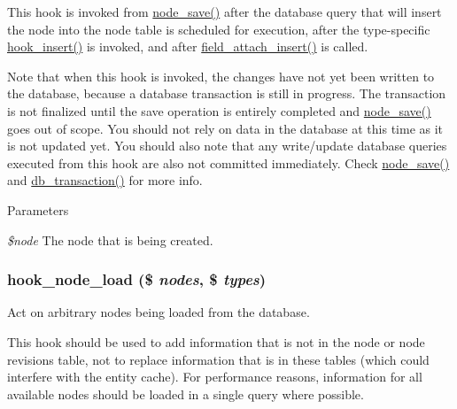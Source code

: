 This hook is invoked from \hyperlink{node_8module_a26add7591be64b30a18232927ef14faf}{node\_\-save()} after the database query that will insert the node into the node table is scheduled for execution, after the type-\/specific \hyperlink{group__node__api__hooks_ga3c6a28d33e07d3506e1eb99718ef4e39}{hook\_\-insert()} is invoked, and after \hyperlink{group__field__attach_gad7c37d577b97db5e0c182bc570ed7cf4}{field\_\-attach\_\-insert()} is called.

Note that when this hook is invoked, the changes have not yet been written to the database, because a database transaction is still in progress. The transaction is not finalized until the save operation is entirely completed and \hyperlink{node_8module_a26add7591be64b30a18232927ef14faf}{node\_\-save()} goes out of scope. You should not rely on data in the database at this time as it is not updated yet. You should also note that any write/update database queries executed from this hook are also not committed immediately. Check \hyperlink{node_8module_a26add7591be64b30a18232927ef14faf}{node\_\-save()} and \hyperlink{group__database_gabdd0e69f5b2c63f8ad9e76f0fdf552be}{db\_\-transaction()} for more info.


\begin{DoxyParams}{Parameters}
\item[{\em \$node}]The node that is being created. \end{DoxyParams}
\hypertarget{group__node__api__hooks_gad48bb14b68ed38526029d1f7ac2d2de4}{
\subsubsection[{hook\_\-node\_\-load}]{\setlength{\rightskip}{0pt plus 5cm}hook\_\-node\_\-load (\$ {\em nodes}, \/  \$ {\em types})}}
\label{group__node__api__hooks_gad48bb14b68ed38526029d1f7ac2d2de4}
Act on arbitrary nodes being loaded from the database.

This hook should be used to add information that is not in the node or node revisions table, not to replace information that is in these tables (which could interfere with the entity cache). For performance reasons, information for all available nodes should be loaded in a single query where possible.

